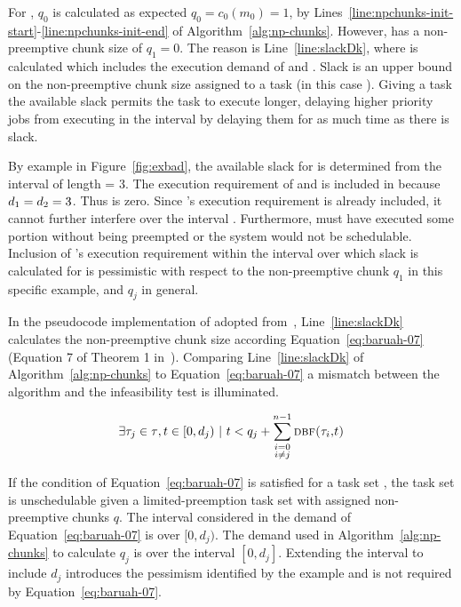 \documentclass[a4paper,UKenglish,cleveref,autoref,english]{lipics-v2019}
\begin{document}
For , ${q_0}$ is calculated as expected
${q_0 = c_0(m_0) = 1}$, by
Lines~\ref{line:npchunks-init-start}-\ref{line:npchunks-init-end} of
Algorithm~\ref{alg:np-chunks}. However,  has a non-preemptive
chunk size of ${q_1 = 0}$. The reason is Line~\ref{line:slackDk},
where  is calculated which includes the execution
demand of  and . Slack is an upper bound on
the non-preemptive chunk size assigned to a task (in this case
). Giving a task the available slack permits the task to
execute longer, delaying higher priority jobs from executing in the
interval by delaying them for as much time as there is slack.

By example in Figure~\ref{fig:exbad}, the available slack for 
is determined from the interval of length  = 3. The
execution requirement of  and  is included
in  because ${d_{1} = d_{2} = 3}$. Thus
 is zero. Since 's execution requirement
is already included, it cannot 
further interfere over the interval . Furthermore,
 must have executed some portion without being preempted or
the system would not be schedulable. Inclusion of 's execution
requirement within the interval over which slack is calculated for is
pessimistic with respect to the non-preemptive chunk ${q_1}$ in this
specific example, and ${q_j}$ in general.


In the pseudocode implementation of \npchunks{} adopted
from~\cite{Baruah:2005}, Line~\ref{line:slackDk} calculates the
non-preemptive chunk size according Equation~\ref{eq:baruah-07}
(Equation 7 of Theorem 1 in~\cite{Baruah:2005}). Comparing
Line~\ref{line:slackDk} of Algorithm~\ref{alg:np-chunks} to
Equation~\ref{eq:baruah-07} a mismatch between the algorithm and the
infeasibility test is illuminated. 

\begin{definition}
\begin{equation}
  \exists \tau_{j} \in \tau{}, t \in [0, d_j) ~|~ t < q_j +
    \sum_{\substack{{i=0}\\{i \not = j}}}^{n - 1}
    \text{\sc{dbf}(\ensuremath{\tau_{i}},$t$)}
    \label{eq:baruah-07}
\end{equation}
\end{definition}

If the condition of Equation~\ref{eq:baruah-07} is
satisfied for a task set \tasks{}, the task set is unschedulable given
a limited-preemption task set with assigned non-preemptive chunks
${q}$. The interval considered in the demand of
Equation~\ref{eq:baruah-07} is over ${[0,d_j)}$. The demand used in 
Algorithm~\ref{alg:np-chunks} to calculate ${q_j}$ is over the
interval ${[0, d_j]}$. Extending the interval to include ${d_j}$
introduces the pessimism identified by the example and is not required
by Equation~\ref{eq:baruah-07}.
\end{document}
